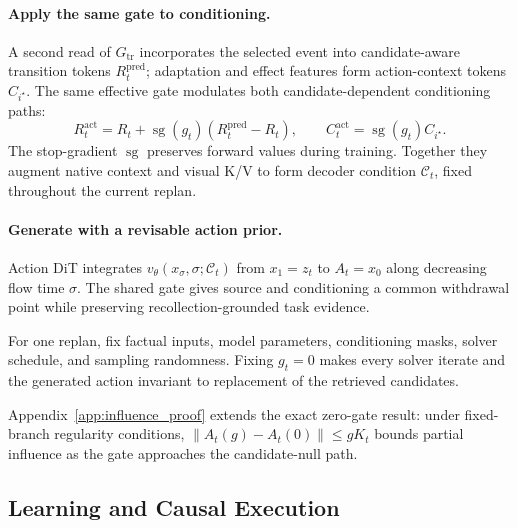 \paragraph{Apply the same gate to conditioning.}
A second read of $G_{\mathrm{tr}}$ incorporates the selected event into candidate-aware transition tokens $R_t^{\mathrm{pred}}$; adaptation and effect features form action-context tokens $C_{i^\star}$.
The same effective gate modulates both candidate-dependent conditioning paths:
\begin{equation}
 R_t^{\mathrm{act}}=R_t+\operatorname{sg}(g_t)(R_t^{\mathrm{pred}}-R_t),\qquad
 C_t^{\mathrm{act}}=\operatorname{sg}(g_t)C_{i^\star}.
 \label{eq:conditions}
\end{equation}
The stop-gradient $\operatorname{sg}$ preserves forward values during training.
Together they augment native context and visual K/V to form decoder condition $\mathcal C_t$, fixed throughout the current replan.

\paragraph{Generate with a revisable action prior.}
Action DiT integrates $v_\theta(x_\sigma,\sigma;\mathcal C_t)$ from $x_1=z_t$ to $A_t=x_0$ along decreasing flow time $\sigma$.
The shared gate gives source and conditioning a common withdrawal point while preserving recollection-grounded task evidence.

\begin{warmproposition}
\label{prop:withdrawal}
For one replan, fix factual inputs, model parameters, conditioning masks, solver schedule, and sampling randomness.
Fixing $g_t=0$ makes every solver iterate and the generated action invariant to replacement of the retrieved candidates.
\end{warmproposition}
Appendix~\ref{app:influence_proof} extends the exact zero-gate result: under fixed-branch regularity conditions, $\|A_t(g)-A_t(0)\|\leq gK_t$ bounds partial influence as the gate approaches the candidate-null path.

\subsection{Learning and Causal Execution}
\label{sec:learning}


